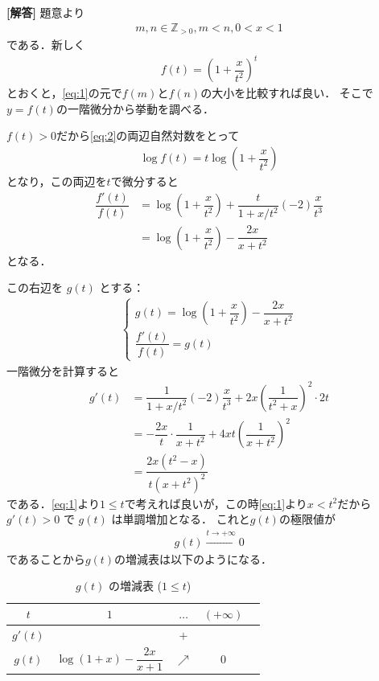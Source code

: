 \documentclass[../../main.tex]{subfiles}
\begin{document}
\begin{oframed}
  
\end{oframed}

{\bf [解答]}
題意より
\begin{align}
  m,n\in\mathbb{Z}_{>0}, m<n, 0<x<1 \label{eq:1}
\end{align}
である．新しく
\begin{align}
  f(t)=\left(1+\dfrac{x}{t^2}\right)^t \label{eq:2}
\end{align}
とおくと，\cref{eq:1}の元で$f(m)$と$f(n)$の大小を比較すれば良い．
そこで$y=f(t)$の一階微分から挙動を調べる．

$f(t)>0$だから\cref{eq:2}の両辺自然対数をとって
\begin{align}
  \log f(t) = t \log \left(1+\dfrac{x}{t^2}\right)
\end{align}
となり，この両辺を$t$で微分すると
\begin{align}
  \dfrac{f'(t)}{f(t)}
  &=\log\left(1+\dfrac{x}{t^2}\right)+\dfrac{t}{1+x/t^2}(-2)\dfrac{x}{t^3} \\
  &= \log\left(1+\dfrac{x}{t^2}\right)-\dfrac{2x}{x+t^2} \label{eq:3}
\end{align}
となる．

この右辺を $g(t)$ とする：
\begin{align}
  \begin{cases}
    g(t) = \log\left(1+\dfrac{x}{t^2}\right)-\dfrac{2x}{x+t^2} \\
    \dfrac{f'(t)}{f(t)} = g(t)
  \end{cases} \label{eq:4}
\end{align}
一階微分を計算すると
\begin{align}
  g'(t)
  &=\dfrac{1}{1+x/t^2}(-2)\dfrac{x}{t^3}+2x\left(\dfrac{1}{t^2+x}\right)^2\cdot2t \\
  &= -\dfrac{2x}{t}\cdot\dfrac{1}{x+t^2}+4xt\left(\dfrac{1}{x+t^2}\right)^2 \\
  &= \dfrac{2x(t^2-x)}{t(x+t^2)^2}
\end{align}
である．\cref{eq:1}より$1\le t$で考えれば良いが，この時\cref{eq:1}より$x<t^2$だから$g'(t)>0$ で $g(t)$ は単調増加となる．
これと$g(t)$の極限値が
\begin{align}
  g(t)\xrightarrow{t\to+\infty}0
\end{align}
であることから$g(t)$の増減表は以下のようになる．

\begin{table}[htb]
  \centering
  \caption{$g(t)$ の増減表 ($1 \le t$)}
  \begin{tabular}{c|cccc}
    $t$ & $1$ & $\dots$ & $(+\infty)$ \\ \hline
    $g'(t)$ &  & $+$ &  \\ \hline
    $g(t)$ & $\log(1+x) - \dfrac{2x}{x+1}$ & $\nearrow$ & $0$
  \end{tabular}
\end{table}
\end{document}
